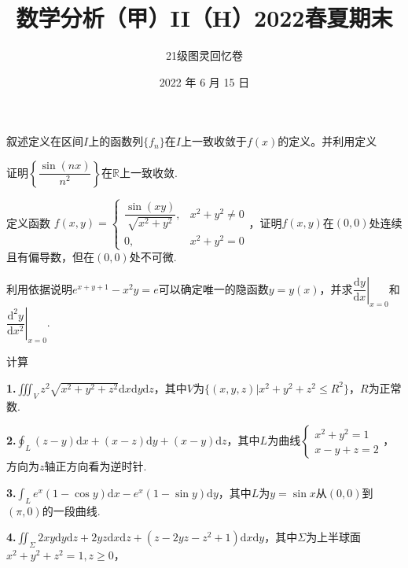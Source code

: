 \documentclass[UTF8,14pt,normal]{ctexart}
\title{\vspace{-5em}\bf 数学分析（甲）II（H）2022春夏期末}
\author{21级图灵回忆卷}
\date{2022 年 6 月 15 日}
\begin{document}
    \maketitle 
    
     叙述定义在区间$I$上的函数列$\{f_n\}$在$I$上一致收敛于$f(x)$的定义。并利用定义\vspace{0.6em}
    
    \noindent 证明$\left\{\dfrac{\sin(nx)}{n^2}\right\}$在$\mathbb{R}$上一致收敛.\vspace{0.5em}
    
    定义函数 $f(x, y)=\begin{cases}\dfrac{\sin(xy)}{\sqrt{x^2+y^2}}, &x^2+y^2\neq0\\0, &x^2+y^2=0\end{cases}$，证明$f(x, y)$在$(0, 0)$处连续且有偏导数，但在$(0, 0)$处不可微.\vspace{1em}
    
    利用依据说明$e^{x+y+1} -x^2y = e$可以确定唯一的隐函数$y=y(x)$，并求$\left.\dfrac{\mathrm dy}{\mathrm dx}\right|_{x=0}$和$\left.\dfrac{\mathrm d^2y}{\mathrm dx^2}\right|_{x=0}$.\vspace{1.2em}
    
    计算\vspace{1em}
     
    \textbf{1.}$\displaystyle\iiint_Vz^2\sqrt{x^2+y^2+z^2}\mathrm dx\mathrm dy\mathrm dz$，其中$V$为$\{(x, y, z)|x^2+y^2+z^2\leq R^2\}$，$R$为正常数.\vspace{0.5em}
    
    \textbf{2.}$\displaystyle\oint_L(z-y)\mathrm dx + (x-z)\mathrm dy + (x-y)\mathrm dz$，其中$L$为曲线$\begin{cases}x^2+y^2=1\\x-y+z=2\end{cases}$，方向为$z$轴正方向看为逆时针.\vspace{1em}
    
    \textbf{3.}$\displaystyle\int_Le^x(1-\cos y)\mathrm dx-e^x(1-\sin y)\mathrm dy$，其中$L$为$y=\sin x$从$(0, 0)$到$(\pi, 0)$的一段曲线.\vspace{1em}
    
    \textbf{4.}$\displaystyle\iint_\Sigma2xy\mathrm dy\mathrm dz+2yz\mathrm dx\mathrm dz+(z-2yz-z^2+1)\mathrm dx\mathrm dy$，其中$\Sigma$为上半球面$x^2+y^2+z^2=1, z\geq 0$，\vspace{-1em}
    
\end{document}
